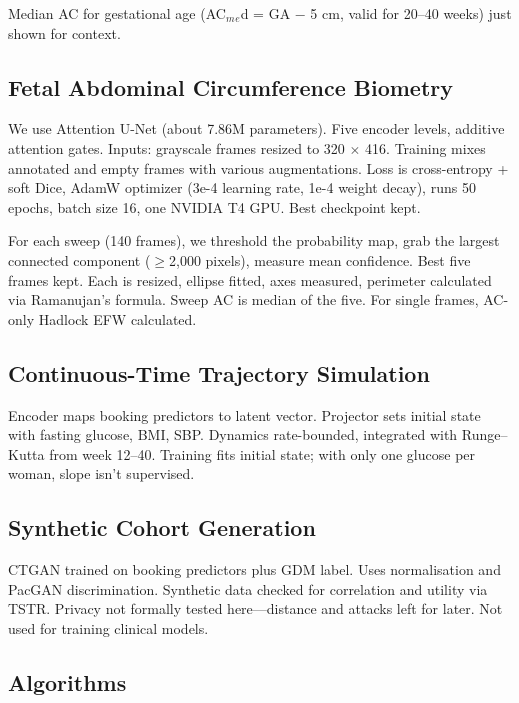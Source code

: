\documentclass[conference]{IEEEtran}
\begin{document}
Median AC for gestational age (AC$_{m}$$_{e}$d = GA \ensuremath{-} 5 cm, valid for 20--40 weeks) just shown for context.



\subsection{Fetal Abdominal Circumference Biometry}

We use Attention U-Net (about 7.86M parameters). Five encoder levels, additive attention gates. Inputs: grayscale frames resized to 320 \ensuremath{\times} 416. Training mixes annotated and empty frames with various augmentations. Loss is cross-entropy + soft Dice, AdamW optimizer (3e-4 learning rate, 1e-4 weight decay), runs 50 epochs, batch size 16, one NVIDIA T4 GPU. Best checkpoint kept.



For each sweep (140 frames), we threshold the probability map, grab the largest connected component (\ensuremath{\geq}2,000 pixels), measure mean confidence. Best five frames kept. Each is resized, ellipse fitted, axes measured, perimeter calculated via Ramanujan's formula. Sweep AC is median of the five. For single frames, AC-only Hadlock EFW calculated.



\subsection{Continuous-Time Trajectory Simulation}

Encoder maps booking predictors to latent vector. Projector sets initial state with fasting glucose, BMI, SBP. Dynamics rate-bounded, integrated with Runge--Kutta from week 12--40. Training fits initial state; with only one glucose per woman, slope isn't supervised.



\subsection{Synthetic Cohort Generation}

CTGAN trained on booking predictors plus GDM label. Uses normalisation and PacGAN discrimination. Synthetic data checked for correlation and utility via TSTR. Privacy not formally tested here---distance and attacks left for later. Not used for training clinical models.



\subsection{Algorithms}
\end{document}
